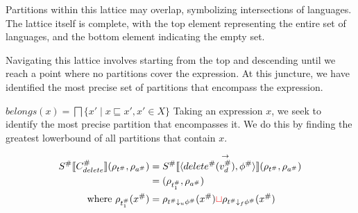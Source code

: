 Partitions within this lattice may overlap, symbolizing intersections of languages. The lattice itself is complete, with the top element representing the entire set of languages, and the bottom element indicating the empty set.

Navigating this lattice involves starting from the top and descending until we reach a point where no partitions cover the expression. At this juncture, we have identified the most precise set of partitions that encompass the expression.

$ belongs(x)=\bigsqcap\{x' \mid x \sqsubseteq x', x' \in X\} $
Taking an expression $x$, we seek to identify the most precise partition that encompasses it. We do this by finding the greatest lowerbound of all partitions that contain $x$.


\begin{align*}
    S^\# \llbracket C^\#_{delete} \rrbracket(\rho_{t^\#}, \rho_{a^\#})
                                              & = S^\# \llbracket \langle delete^\#(\overset{\rightarrow}{v_d^\#}), \phi^\# \rangle \rrbracket (\rho_{t^\#}, \rho_{a^\#})                               \\
                                              & = (\rho_{t^\#_1}, \rho_{a^\#})                                                                                     \\
    \text{where } \rho_{t^\#_1}(x^\#) & = \rho_{t^\# \downarrow_u \phi^\#}(x^\#) \textcolor{red}{\sqcup} \rho_{t^\# \downarrow_f \phi^\#}(x^\#)
\end{align*}

